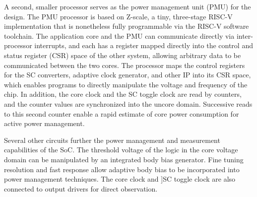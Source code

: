 \documentclass[graybox]{svmult}
\begin{document}
A second, smaller processor serves as the power management unit (PMU) for the design.
The PMU processor is based on Z-scale, a tiny, three-stage RISC-V implementation that is nonetheless fully programmable via the RISC-V software toolchain.
The application core and the PMU can communicate directly via inter-processor interrupts, and each has a register mapped directly into the control and status register (CSR) space of the other system, allowing arbitrary data to be communicated between the two cores.
The processor maps the control registers for the SC converters, adaptive clock generator, and other IP into its CSR space, which enables programs to directly manipulate the voltage and frequency of the chip.
In addition, the core clock and the SC toggle clock are read by counters, and the counter values are synchronized into the uncore domain.
Successive reads to this second counter enable a rapid estimate of core power consumption for active power management.

Several other circuits further the power management and measurement capabilities of the SoC.
The threshold voltage of the logic in the core voltage domain can be manipulated by an integrated body bias generator.
Fine tuning resolution and fast response allow adaptive body bias to be incorporated into power management techniques.
The core clock and ]SC toggle clock are also connected to output drivers for direct observation.
\end{document}
